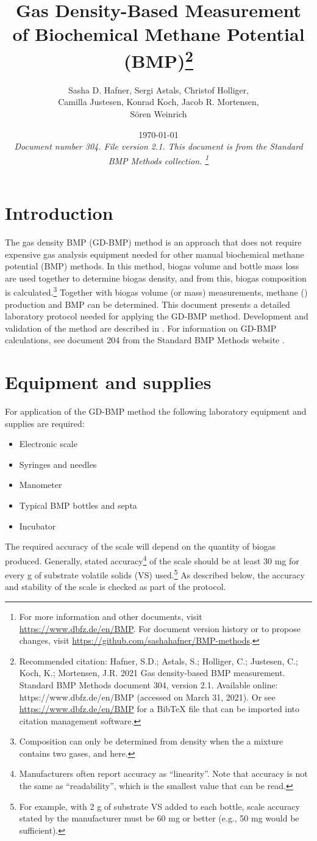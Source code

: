 \documentclass[]{article}
\title {Gas Density-Based Measurement of Biochemical Methane Potential (BMP)\footnote{
  Recommended citation: 
Hafner, S.D.; Astals, S.; Holliger, C.; Justesen, C.; Koch, K.; Mortensen, J.R. 2021 Gas density-based BMP measurement. Standard BMP Methods document 304, version 2.1. Available online: https://www.dbfz.de/en/BMP (accessed on March 31, 2021).
\newline
  Or see \url{https://www.dbfz.de/en/BMP} for a BibTeX file that can be imported into citation management software.
}
}
\author{Sasha D. Hafner, Sergi Astals, Christof Holliger, \\ Camilla Justesen, Konrad Koch, Jacob R. Mortensen, \\ S\"oren Weinrich}
\date{\today \\
\bigskip
\textit{
  Document number 304.
  File version 2.1. 
  This document is from the Standard BMP Methods collection.
    \footnote{For more information and other documents, visit \url{https://www.dbfz.de/en/BMP}. 
    For document version history or to propose changes, visit \url{https://github.com/sashahafner/BMP-methods}.}
}
}
\begin{document}
\maketitle

\section{Introduction}
The gas density BMP (GD-BMP) method is an approach that does not require expensive gas analysis equipment needed for other manual biochemical methane potential (BMP) methods.
In this method, biogas volume and bottle mass loss are used together to determine biogas density, and from this, biogas composition is calculated.\footnote{Composition can only be determined from density when the a mixture contains two gases,  and  here.}
Together with biogas volume (or mass) measurements, methane () production and BMP can be determined.
This document presents a detailed laboratory protocol needed for applying the GD-BMP method.
Development and validation of the method are described in \citet{justesenDevelopmentValidationLowcost2019}.
For information on GD-BMP calculations, see document 204 from the Standard BMP Methods website \citep{BMPdoc204gasdens}. 

\section{Equipment and supplies}
\label{sec:equipment}
For application of the GD-BMP method the following laboratory equipment and supplies are required:
\begin{itemize}
    \item Electronic scale
    \item Syringes and needles
    \item Manometer
    \item Typical BMP bottles and septa
    \item Incubator
\end{itemize}

The required accuracy of the scale will depend on the quantity of biogas produced. 
Generally, stated accuracy\footnote{
  Manufacturers often report accuracy as ``linearity''. 
  Note that accuracy is not the same as ``readability'', which is the smallest value that can be read. 
} of the scale should be at least 30 mg for every g of substrate volatile solids (VS) used.\footnote{
  For example, with 2 g of substrate VS added to each bottle, scale accuracy stated by the manufacturer must be 60 mg or better (e.g., 50 mg would be sufficient).
}
As described below, the accuracy and stability of the scale is checked as part of the protocol.
\end{document}
